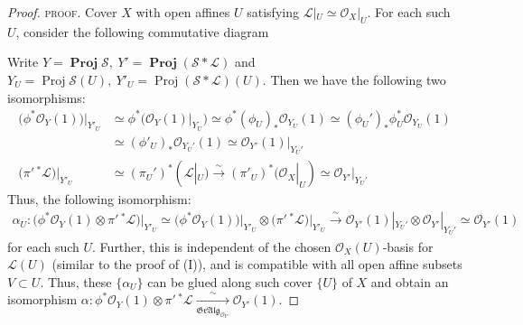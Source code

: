 \documentclass[11pt,a4paper,footinclude=true,headinclude=true]{scrbook} %
\DeclareMathOperator{\Proj}{Proj}
\DeclareMathOperator{\PROJ}{\mathbf{Proj}}
\newcommand{\LL}{\mathscr{L}}
\newcommand{\OO}{\mathcal{O}}
\newcommand{\Ss}{\mathscr{S}}
\newcommand{\<}{\langle}
\newcommand{\>}{\rangle}
\newcommand{\isolongto}{\overset{\sim}{\longrightarrow}}
\newcommand{\GR}{\mathfrak{Gr}}
\newcommand{\ALG}{\mathfrak{Alg}}
\begin{document}
\begin{proof}
    \textsc{proof.} Cover $X$ with open affines $U$ satisfying $\LL|_U\simeq\OO_X|_U$. For each such $U$, consider the following commutative diagram
    \begin{center}
    \end{center}
    Write $Y=\PROJ\Ss,\ Y'=\PROJ(\Ss\ast\LL)$ and $Y_U=\Proj\Ss(U),\ Y'_U=\Proj(\Ss\ast\LL)(U)$. Then we have the following two isomorphisms:
    \begin{align*}
        \Big(\phi^\ast\OO_Y(1)\Big)\Big|_{Y'_U} &\simeq\phi^\ast\Big(\OO_Y(1)|_{Y_U}\Big)\simeq\phi^\ast(\phi_U)_\ast\OO_{Y_U}(1)\simeq(\phi_U')_\ast\phi_U^\ast\OO_{Y_U}(1)\\ &\simeq(\phi'_U)_\ast\OO_{Y_U'}(1)\simeq\OO_{Y'}(1)|_{Y_U'}\tag{i}\\
        \Big(\pi'\,^\ast\LL\Big)\Big|_{Y'_U} &\simeq(\pi_U')^\ast(\LL|_U)\isolongto(\pi'_U)^\ast(\OO_X|_U)\simeq\OO_{Y'}|_{Y_U'}\tag{ii}
    \end{align*}
    Thus, the following isomorphism:
    \begin{multline*}
        \alpha_U:\Big(\phi^\ast\OO_Y(1)\otimes\pi'\,^\ast\LL\Big)\Big|_{Y'_U}\simeq\Big(\phi^\ast\OO_Y(1)\Big)\Big|_{Y'_U}\otimes\Big(\pi'\,^\ast\LL\Big)\Big|_{Y'_U}\isolongto\OO_{Y'}(1)|_{Y_U'}\otimes\OO_{Y'}|_{Y_U'}\simeq\OO_{Y'}(1)
    \end{multline*}
    for each such $U$. Further, this is independent of the chosen $\OO_X(U)$-basis for $\LL(U)$ (similar to the proof of (I)), and is compatible with all open affine subsets $V\subset U$. Thus, these $\{\alpha_U\}$ can be glued along such cover $\{U\}$ of $X$ and obtain an isomorphism $\alpha:\phi^\ast\OO_Y(1)\otimes\pi'\,^\ast\LL\xrightarrow[\GR\ALG_{\OO_{Y'}}]{\sim}\OO_{Y'}(1)$.
\end{proof}
\end{document}

